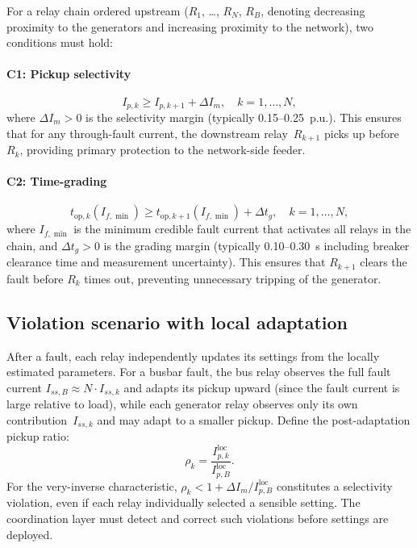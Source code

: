 \documentclass[journal,twoside,letterpaper]{IEEEtran}
\begin{document}
For a relay chain ordered upstream ($R_1$, \dots, $R_N$,
$R_B$, denoting decreasing proximity to the generators
and increasing proximity to the network), two conditions
must hold:

\paragraph{C1: Pickup selectivity}
\begin{equation}
  I_{p,k} \geq I_{p,k+1} + \Delta I_m,
  \quad k = 1,\dots,N,
\label{eq:selectivity}
\end{equation}
where $\Delta I_m > 0$ is the selectivity margin (typically
0.15--0.25~p.u.).  This ensures that for any through-fault
current, the downstream relay~$R_{k+1}$ picks up before~$R_k$,
providing primary protection to the network-side feeder.

\paragraph{C2: Time-grading}
\begin{equation}
  t_{\mathrm{op},k}(I_{f,\min})
    \geq t_{\mathrm{op},k+1}(I_{f,\min}) + \Delta t_g,
  \quad k = 1,\dots,N,
\label{eq:grading}
\end{equation}
where $I_{f,\min}$ is the minimum credible fault current that
activates all relays in the chain, and $\Delta t_g > 0$ is the
grading margin (typically 0.10--0.30~s including breaker
clearance time and measurement uncertainty).
This ensures that $R_{k+1}$ clears the fault before $R_k$
times out, preventing unnecessary tripping of the generator.

\subsection{Violation scenario with local adaptation}

After a fault, each relay independently updates its settings
from the locally estimated parameters.  For a busbar fault,
the bus relay observes the full fault current
$I_{ss,B} \approx N \cdot I_{ss,k}$ and adapts its pickup
upward (since the fault current is large relative to load),
while each generator relay observes only its own
contribution~$I_{ss,k}$ and may adapt to a smaller pickup.
Define the post-adaptation pickup ratio:
\begin{equation}
  \rho_k = \frac{I_{p,k}^{\mathrm{loc}}}{I_{p,B}^{\mathrm{loc}}}.
\end{equation}
For the very-inverse characteristic,
$\rho_k < 1 + \Delta I_m / I_{p,B}^{\mathrm{loc}}$
constitutes a selectivity violation, even if each relay
individually selected a sensible setting.
The coordination layer must detect and correct such violations
before settings are deployed.
\end{document}
